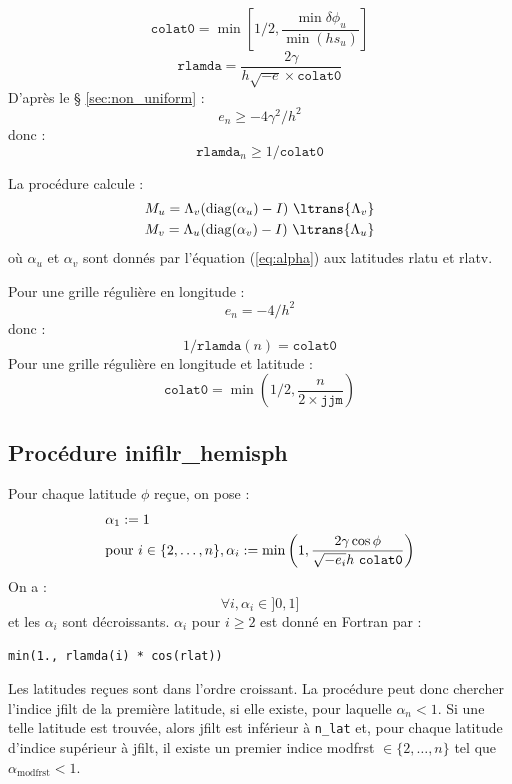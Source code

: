 \documentclass[a4paper,english,french]{article}
\begin{document}
\begin{equation*}
  \mathtt{colat0}
  = \min\left[1/2, \frac{\min \delta \phi_u}{\min (h s_u)} \right]
\end{equation*}
\begin{equation*}
  \mathtt{rlamda} = \frac{2 \gamma}{h \sqrt{-e} \times \mathtt{colat0}}
\end{equation*}
D'après le § \ref{sec:non_uniform} :
\begin{equation*}
  e_n \ge - 4 \gamma^2 / h^2
\end{equation*}
donc :
\begin{equation}
  \label{eq:rlamda}
  \mathtt{rlamda}_n \ge 1 / \mathtt{colat0}
\end{equation}

La procédure calcule :
\begin{align*}
  & M_u = \Lambda_v (\mathrm{diag}(\alpha_u) - I)\ \ltrans{\Lambda_v} \\
  & M_v = \Lambda_u (\mathrm{diag}(\alpha_v) - I)\ \ltrans{\Lambda_u}
\end{align*}
où $\alpha_u$ et $\alpha_v$ sont donnés par l'équation
(\ref{eq:alpha}) aux latitudes rlatu et rlatv.

Pour une grille régulière en longitude :
\begin{equation*}
  e_n = - 4 / h^2
\end{equation*}
donc :
\begin{equation*}
  1 / \mathtt{rlamda}(n) = \mathtt{colat0}
\end{equation*}
Pour une grille régulière en longitude et latitude :
\begin{equation*}
  \mathtt{colat0}
  = \min\left(1/2, \frac{n}{2 \times \mathtt{jjm}} \right)
\end{equation*}

\subsection{Procédure inifilr\_hemisph}

Pour chaque latitude $\phi$ reçue, on pose :
\begin{align}
  \notag
  & \alpha_1 := 1 \\
  \label{eq:alpha}
  & \mathrm{pour}\ i \in \{2, \dots, n\}, \alpha_i
  := \min
  \left(1, \frac{2 \gamma \cos \phi}{\sqrt{- e_i} h\ \mathtt{colat0}} \right)
\end{align}
On a :
\begin{equation*}
  \forall i, \alpha_i \in ]0, 1]
\end{equation*}
et les $\alpha_i$ sont décroissants. $\alpha_i$ pour $i \ge 2$ est
donné en Fortran par :
\begin{verbatim}
min(1., rlamda(i) * cos(rlat))
\end{verbatim}
Les latitudes reçues sont dans l'ordre croissant. La procédure peut
donc chercher l'indice jfilt de la première latitude, si elle existe,
pour laquelle $\alpha_n < 1$. Si une telle latitude est trouvée, alors
jfilt est inférieur à \verb+n_lat+ et, pour chaque latitude d'indice
supérieur à jfilt, il existe un premier indice modfrst $\in \{2,
\dots, n\}$ tel que $\alpha_\mathrm{modfrst} < 1$.
\end{document}
